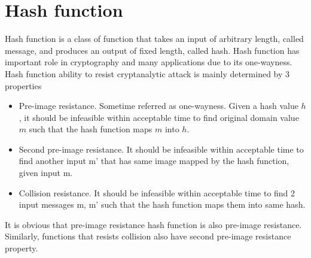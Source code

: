 \chapter{Hash function}
Hash function is a class of function that takes an input of arbitrary length, called message, and produces an output of fixed length, called hash. Hash function has important role in cryptography and many applications due to its one-wayness. Hash function ability to resist cryptanalytic attack is mainly determined by 3 properties
\begin{itemize}
    \item Pre-image resistance. Sometime referred as one-wayness. Given a hash value $h$, it should be infeasible within acceptable time to find original domain value $m$ such that the hash function maps $m$ into $h$.
    \item Second pre-image resistance. It should be infeasible within acceptable time to find another input m’ that has same image mapped by the hash function, given input m.
    \item Collision resistance. It should be infeasible within acceptable time to find 2 input messages m, m’ such that the hash function maps them into same hash.
\end{itemize}

It is obvious that pre-image resistance hash function is also pre-image resistance. Similarly, functions that resists collision also have second pre-image resistance property.